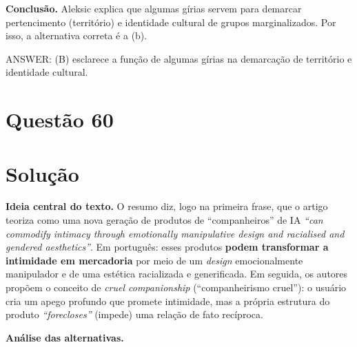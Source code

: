 \documentclass{article}%
\begin{document}
\textbf{Conclusão.} Aleksic explica que algumas gírias servem para demarcar pertencimento (território) e identidade cultural de grupos marginalizados. Por isso, a alternativa correta é a (b).

ANSWER: (B) esclarece a função de algumas gírias na demarcação de território e identidade cultural.%
\newpage%
\section*{Questão 60}

\section*{Solução}

\textbf{Ideia central do texto.} O resumo diz, logo na primeira frase, que o artigo teoriza como uma nova geração de produtos de ``companheiros'' de IA \emph{``can commodify intimacy through emotionally manipulative design and racialised and gendered aesthetics''}. Em português: esses produtos \textbf{podem transformar a intimidade em mercadoria} por meio de um \emph{design} emocionalmente manipulador e de uma estética racializada e generificada. Em seguida, os autores propõem o conceito de \emph{cruel companionship} (``companheirismo cruel''): o usuário cria um apego profundo que promete intimidade, mas a própria estrutura do produto \emph{``forecloses''} (impede) uma relação de fato recíproca.

\textbf{Análise das alternativas.}
\end{document}

